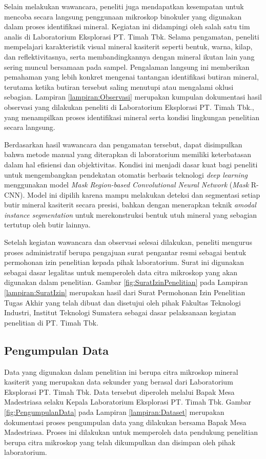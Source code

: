 Selain melakukan wawancara, peneliti juga mendapatkan kesempatan untuk mencoba secara langsung penggunaan mikroskop binokuler yang digunakan dalam proses identifikasi mineral. Kegiatan ini didampingi oleh salah satu tim analis di Laboratorium Eksplorasi PT. Timah Tbk. Selama pengamatan, peneliti mempelajari karakteristik visual mineral kasiterit seperti bentuk, warna, kilap, dan reflektivitasnya, serta membandingkannya dengan mineral ikutan lain yang sering muncul bersamaan pada sampel. Pengalaman langsung ini memberikan pemahaman yang lebih konkret mengenai tantangan identifikasi butiran mineral, terutama ketika butiran tersebut saling menutupi atau mengalami oklusi sebagian. Lampiran \ref{lampiran:Observasi} merupakan kumpulan dokumentasi hasil observasi yang dilakukan peneliti di Laboratorium Eksplorasi PT. Timah Tbk., yang menampilkan proses identifikasi mineral serta kondisi lingkungan penelitian secara langsung. \par

Berdasarkan hasil wawancara dan pengamatan tersebut, dapat disimpulkan bahwa metode manual yang diterapkan di laboratorium memiliki keterbatasan dalam hal efisiensi dan objektivitas. Kondisi ini menjadi dasar kuat bagi peneliti untuk mengembangkan pendekatan otomatis berbasis teknologi \textit{deep learning} menggunakan model \textit{Mask Region-based Convolutional Neural Network} (\textit{Mask} R-CNN). Model ini dipilih karena mampu melakukan deteksi dan segmentasi setiap butir mineral kasiterit secara presisi, bahkan dengan menerapkan teknik \textit{amodal instance segmentation} untuk merekonstruksi bentuk utuh mineral yang sebagian tertutup oleh butir lainnya. \par

Setelah kegiatan wawancara dan observasi selesai dilakukan, peneliti mengurus proses administratif berupa pengajuan surat pengantar resmi sebagai bentuk permohonan izin penelitian kepada pihak laboratorium. Surat ini digunakan sebagai dasar legalitas untuk memperoleh data citra mikroskop yang akan digunakan dalam penelitian. Gambar \ref{fig:SuratIzinPenelitian} pada Lampiran \ref{lampiran:SuratIzin} merupakan hasil dari Surat Permohonan Izin Penelitian Tugas Akhir yang telah dibuat dan disetujui oleh pihak Fakultas Teknologi Industri, Institut Teknologi Sumatera sebagai dasar pelaksanaan kegiatan penelitian di PT. Timah Tbk.\par

\subsection{Pengumpulan Data} \label{III.LangkahPengumpulanData}
Data yang digunakan dalam penelitian ini berupa citra mikroskop mineral kasiterit yang merupakan data sekunder yang berasal dari Laboratorium Eksplorasi PT. Timah Tbk. Data tersebut diperoleh melalui Bapak Mesa Madestriasa selaku Kepala Laboratorium Eksplorasi PT. Timah Tbk. Gambar \ref{fig:PengumpulanData} pada Lampiran \ref{lampiran:Dataset} merupakan dokumentasi proses pengumpulan data yang dilakukan bersama Bapak Mesa Madestriasa. Proses ini dilakukan untuk memperoleh data pendukung penelitian berupa citra mikroskop yang telah dikumpulkan dan disimpan oleh pihak laboratorium. \par

